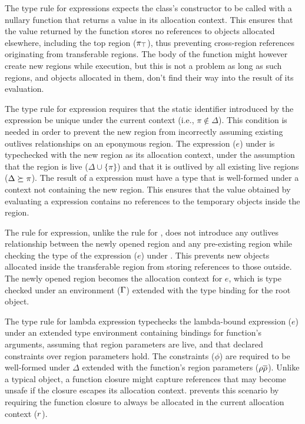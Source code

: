 The type rule for  expressions expects the \RgnZ class's
constructor to be called with a nullary function that returns a value
in its allocation context. 
This ensures that the value returned by the function stores no
references to objects allocated elsewhere, including the top region
($\pi_{\top}$), thus preventing cross-region references originating from
transferable regions. The body of the function might however create
new regions while execution, but this is not a problem as long as such
regions, and objects allocated in them, don't find their way into the
result of its evaluation.

The type rule for  expression requires that the static
identifier introduced by the expression be unique under the current
context (i.e., $\pi \notin \Delta$). This condition is needed in order
to prevent the new region from incorrectly assuming existing outlives
relationships on an eponymous region. The expression ($e$) under
 is typechecked with the new region as its allocation
context, under the assumption that the region is live ($\Delta \cup
\{\pi\}$) and that it is outlived by all existing live regions
($\Delta \succeq \pi$). The result of a  expression
must have a type that is well-formed under a context not containing
the new region. This ensures that the value obtained by evaluating a
 expression contains no references to the temporary
objects inside the region.

The rule for  expression, unlike the rule for ,
does not introduce any outlives relationship between the newly opened
region and any pre-existing region while checking the type of the
expression ($e$) under . This prevents new objects allocated
inside the transferable region from storing references to those
outside. The newly opened region becomes the allocation context for
$e$, which is type checked under an environment ($\Gamma$) extended with
the type binding for the root object.

The type rule for lambda expression typechecks the lambda-bound
expression ($e$) under an extended type environment containing
bindings for function's arguments, assuming that region parameters are
live, and that declared constraints over region parameters hold. The
constraints ($\phi$) are required to be well-formed under $\Delta$
extended with the function's region parameters ($\rho\overline{\rho}$).
Unlike a typical object, a function closure might capture references
that may become unsafe if the closure escapes its allocation context.
\FB prevents this scenario by requiring the function closure to always
be allocated in the current allocation context ($r$). 

